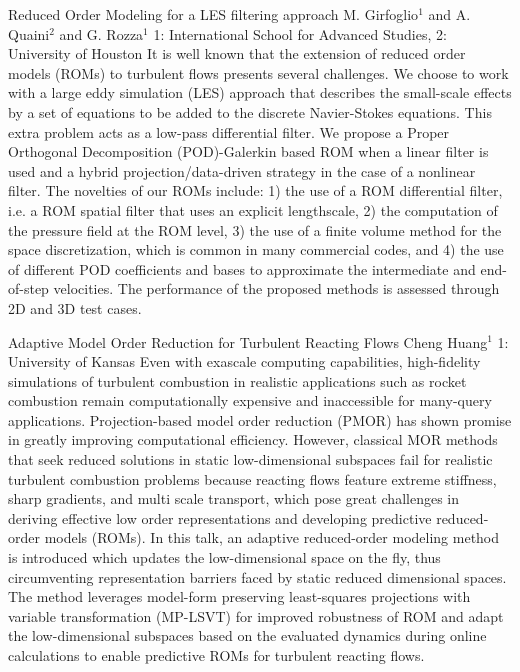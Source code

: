 \begin{addmargin}[2em]{0em}
\vspace{2ex}
\abs
{Reduced Order Modeling for a LES filtering approach}
{M. Girfoglio$^{1}$ and A. Quaini$^{2}$ and G. Rozza$^{1}$}
{1: International School for Advanced Studies, 2: University of Houston}
{It is well known that the extension of reduced order models (ROMs) to turbulent flows presents several challenges. We choose to work with a large eddy simulation (LES) approach that describes the small-scale effects by a set of equations to be added to the discrete Navier-Stokes equations. This extra problem acts as a low-pass differential filter. We propose a Proper Orthogonal Decomposition (POD)-Galerkin based ROM when a linear filter is used and a hybrid projection/data-driven strategy in the case of a nonlinear filter. The novelties of our ROMs include: 1) the use of a ROM differential filter, i.e. a ROM spatial filter that uses an explicit lengthscale, 2) the computation of the pressure field at the ROM level, 3) the use of a finite volume method for the space discretization, which is common in many commercial codes, and 4) the use of different POD coefficients and bases to approximate the intermediate and end-of-step velocities. The performance of the proposed methods is assessed through 2D and 3D test cases.}


\vspace{1.5ex}
\abs
{Adaptive Model Order Reduction for Turbulent Reacting Flows}
{Cheng Huang$^{1}$}
{1: University of Kansas}
{Even with exascale computing capabilities, high-fidelity simulations of turbulent combustion in realistic applications such as rocket combustion remain computationally expensive and inaccessible for many-query applications. Projection-based model order reduction (PMOR) has shown promise in greatly improving computational efficiency. However, classical MOR methods that seek reduced solutions in static low-dimensional subspaces fail for realistic turbulent combustion problems because reacting flows feature extreme stiffness, sharp gradients, and multi scale transport, which pose great challenges in deriving effective low order representations and developing predictive reduced-order models (ROMs). In this talk, an adaptive reduced-order modeling method is introduced which updates the low-dimensional space on the fly, thus circumventing representation barriers faced by static reduced dimensional spaces. The method leverages model-form preserving least-squares projections with variable transformation (MP-LSVT) for improved robustness of ROM and adapt the low-dimensional subspaces based on the evaluated dynamics during online calculations to enable predictive ROMs for turbulent reacting flows.}



\end{addmargin}
